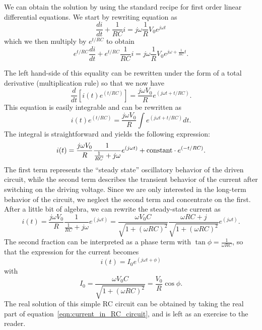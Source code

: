 \documentclass{article}
\begin{document}
We can obtain the solution by using the standard recipe for first order linear differential equations. We start by rewriting equation as
\begin{equation}
\frac{di}{dt} + \frac{1}{R C} i = j \omega \frac{1}{R} V_0 e^{j \omega t}
\end{equation}
which we then multiply by $e^{t/RC}$ to obtain
\begin{equation}
e^{t/RC} \frac{di}{dt} + e^{t/RC} \frac{1}{R C} i = j \omega \frac{1}{R} V_0 e^{j \omega + \frac{1}{RC} t}.
\end{equation}

The left hand-side of this equality can be rewritten under the form of a total derivative (multiplication rule) so that we now have
\begin{equation}
\frac{d}{dt}\left[ i(t) e^{\left(t/RC\right)}\right] = \frac{j\omega V_0}{R} e^{\left( j\omega t + t/RC \right)}.
\end{equation}
This equation is easily integrable and can be rewritten as
\begin{equation}
i(t) e^{\left(t/RC\right)} = \frac{j\omega V_0}{R} \int e^{\left(j\omega t + t/RC\right)} dt.
\end{equation}
The integral is straightforward and yields the following expression:
\begin{equation}
i(t) = \frac{j\omega V_0}{R} \frac{1}{\frac{1}{RC} + j\omega} e^{\left(j\omega t\right)} + \hbox{constant} \cdot e^{\left( -t/RC \right)}.
\end{equation}
The first term represents the ``steady state'' oscillatory behavior of the driven circuit, while the second term describes the transient behavior of the current after switching on the driving voltage. Since we are only interested in the long-term behavior of the circuit, we neglect the second term and concentrate on the first. After a little bit of algebra, we can rewrite the steady-state current as
\begin{equation}
i(t) = \frac{j\omega V_0}{R} \frac{1}{\frac{1}{RC} + j\omega} e^{\left(j\omega t\right)} = \frac{\omega V_0 C}{\sqrt{1 + (\omega RC)^2}} \frac{\omega RC + j}{\sqrt{1 + (\omega RC)^2}} e^{\left(j\omega t\right)}.
\end{equation}
The second fraction can be interpreted as a phase term with $\tan\phi = \frac{1}{\omega RC}$, so that the expression for the current becomes
\begin{equation}
i(t) = I_0 e^{\left(j\omega t + \phi\right)}
\label{eqn:current_in_RC_circuit}
\end{equation}
with
\begin{equation}
I_0 = \frac{\omega V_0 C}{\sqrt{1 + \left(\omega RC\right)^2}} = \frac{V_0}{R} \cos\phi.
\end{equation}
The real solution of this simple RC circuit can be obtained by taking the real part of equation~\ref{eqn:current_in_RC_circuit}, and is left as an exercise to the reader.
\end{document}
